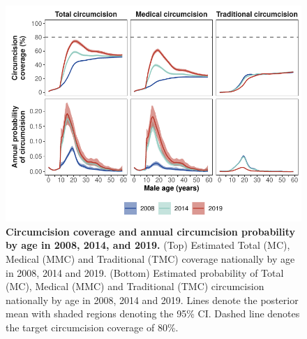 \documentclass{article}
\begin{document}

\begin{figure}[H]
  \centering
  \includegraphics[width = 5.2in]{Figures/paper/Figure4.pdf}
  \caption{{\bf Circumcision coverage and annual circumcision probability by age in 2008, 2014, and 2019.}
    (Top) Estimated Total (MC), Medical (MMC) and Traditional (TMC)  coverage nationally by age in 2008, 2014 and 2019. (Bottom) Estimated probability of Total (MC), Medical (MMC) and Traditional (TMC) circumcision nationally by age in 2008, 2014 and 2019. Lines denote the posterior mean with shaded regions denoting the 95\% CI. Dashed line denotes the target circumcision coverage of 80\%.}
  \label{fig::singleageprev}
\end{figure}

\end{document}
